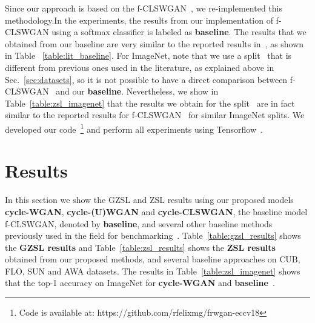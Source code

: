 \documentclass[runningheads]{llncs}
\begin{document}
Since our approach is based on the f-CLSWGAN~\cite{XianCVPR2018}, we re-implemented this methodology.In the experiments, the results from our implementation of f-CLSWGAN using a softmax classifier is labeled as \textbf{baseline}.
The results that we obtained from our baseline are very similar to the reported results in~\cite{XianCVPR2018}, as shown in Table ~\ref{table:lit_baseline}. 
For ImageNet, note that we use a split~\cite{wang2017multi} that is different from previous ones used in the literature, as explained above in Sec.~\ref{sec:datasets}, so it is not possible to have a direct comparison between f-CLSWGAN~\cite{XianCVPR2018} and our \textbf{baseline}.  Nevertheless, we show in Table~\ref{table:zsl_imagenet} that the results we obtain for the split~\cite{wang2017multi} are in fact similar to the reported results  for f-CLSWGAN~\cite{XianCVPR2018} for similar ImageNet splits.
We developed our code~\footnote{Code is available at: https://github.com/rfelixmg/frwgan-eccv18} and perform all experiments using Tensorflow~\cite{abadi2016tensorflow}.



\section{Results}


In this section we show the GZSL and ZSL results using our proposed models \textbf{cycle-WGAN}, \textbf{cycle-(U)WGAN}  and \textbf{cycle-CLSWGAN}, the baseline model f-CLSWGAN, denoted by \textbf{baseline}, and several other baseline methods previously used in the field for benchmarking~\cite{XianCVPR2017}. 
Table~\ref{table:gzsl_results} shows the \textbf{GZSL results} and Table~\ref{table:zsl_results} shows the \textbf{ZSL results} obtained from our proposed methods, and several baseline approaches on CUB, FLO, SUN and AWA datasets.
The results in Table~\ref{table:zsl_imagenet} shows that the top-1 accuracy on ImageNet for \textbf{cycle-WGAN} and \textbf{baseline}~\cite{XianCVPR2018}.
\end{document}
